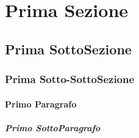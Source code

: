 \documentclass[final,5p,times,12pt,sort&compress,longtitle]{elsarticle}
\begin{document}

\section[shortTitle]{Prima Sezione}
\label{ISec}
\subsection[shortTitle]{Prima SottoSezione}
\blindmathpaper
\subsubsection[shortTitle]{Prima Sotto-SottoSezione}
\paragraph[shortTitle]{Primo Paragrafo}
\subparagraph[shortTitle]{Primo SottoParagrafo}



% 
\end{document}
